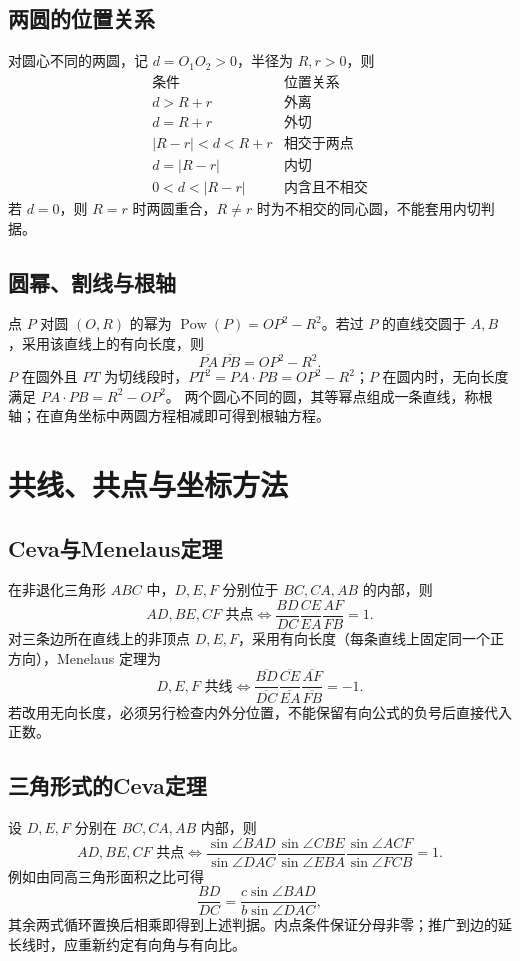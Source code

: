 \documentclass[../main.tex]{subfiles}
\begin{document}
\subsection{两圆的位置关系}
对圆心不同的两圆，记 $d=O_1O_2>0$，半径为 $R,r>0$，则
\[
\begin{array}{c|c}
\text{条件}&\text{位置关系}\\\hline
d>R+r&\text{外离}\\
d=R+r&\text{外切}\\
|R-r|<d<R+r&\text{相交于两点}\\
d=|R-r|&\text{内切}\\
0<d<|R-r|&\text{内含且不相交}
\end{array}
\]
若 $d=0$，则 $R=r$ 时两圆重合，$R\ne r$ 时为不相交的同心圆，不能套用内切判据。
\subsection{圆幂、割线与根轴}
点 $P$ 对圆 $(O,R)$ 的幂为 $\operatorname{Pow}(P)=OP^2-R^2$。若过 $P$ 的直线交圆于 $A,B$，采用该直线上的有向长度，则
\[
\overline{PA}\,\overline{PB}=OP^2-R^2.
\]
$P$ 在圆外且 $PT$ 为切线段时，$PT^2=PA\cdot PB=OP^2-R^2$；$P$ 在圆内时，无向长度满足 $PA\cdot PB=R^2-OP^2$。
两个圆心不同的圆，其等幂点组成一条直线，称根轴；在直角坐标中两圆方程相减即可得到根轴方程。
\section{共线、共点与坐标方法}
\subsection{Ceva与Menelaus定理}
在非退化三角形 $ABC$ 中，$D,E,F$ 分别位于 $BC,CA,AB$ 的内部，则
\[
AD,BE,CF\text{ 共点}\iff\frac{BD}{DC}\frac{CE}{EA}\frac{AF}{FB}=1.
\]
对三条边所在直线上的非顶点 $D,E,F$，采用有向长度（每条直线上固定同一个正方向），Menelaus 定理为
\[
D,E,F\text{ 共线}\iff
\frac{\overline{BD}}{\overline{DC}}\frac{\overline{CE}}{\overline{EA}}\frac{\overline{AF}}{\overline{FB}}=-1.
\]
若改用无向长度，必须另行检查内外分位置，不能保留有向公式的负号后直接代入正数。
\subsection{三角形式的Ceva定理}
设 $D,E,F$ 分别在 $BC,CA,AB$ 内部，则
\[
AD,BE,CF\text{ 共点}\iff
\frac{\sin\angle BAD}{\sin\angle DAC}
\frac{\sin\angle CBE}{\sin\angle EBA}
\frac{\sin\angle ACF}{\sin\angle FCB}=1.
\]
例如由同高三角形面积之比可得
\[
\frac{BD}{DC}=\frac{c\sin\angle BAD}{b\sin\angle DAC},
\]
其余两式循环置换后相乘即得到上述判据。内点条件保证分母非零；推广到边的延长线时，应重新约定有向角与有向比。
\end{document}
